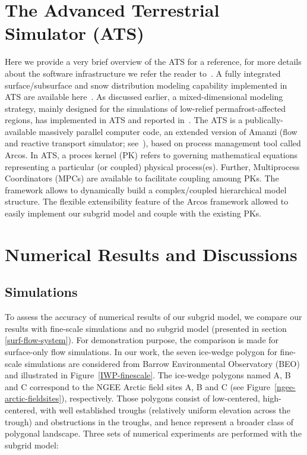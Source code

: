 \documentclass[review,11pt]{elsarticle}
\begin{document}
\section{The Advanced Terrestrial Simulator (ATS)}\label{ATS}
Here we provide a very brief overview of the ATS for a reference, for more details about the software infrastructure we refer the reader to~\cite{ecoon2016managing, ats-website}. A fully integrated surface/subsurface and snow distribution modeling capability implemented in ATS are available here~\cite{spainter2016integrated, atchley2015}. As discussed earlier, a mixed-dimensional modeling strategy, mainly designed for the simulations of low-relief permafrost-affected regions, has implemented in ATS and reported in~\cite{jan2017}. The ATS is a publically-available massively parallel computer code, an extended version of Amanzi (flow and reactive transport simulator; see~\cite{moulton2012high}), based on process management tool called Arcos. In ATS, a proces kernel (PK) refers to governing mathematical equations representing a particular (or coupled) physical process(es). Further, Multiprocess Coordinators (MPCs) are available to facilitate coupling amoung PKs. The framework allows to dynamically build a complex/coupled hierarchical model structure. The flexible extensibility feature of the Arcos framework allowed to easily implement our subgrid model and couple with the existing PKs.

\section{Numerical Results and Discussions}\label{numerical-tests}
\FloatBarrier
\subsection{Simulations}
To assess the accuracy of numerical results of our subgrid model, we compare our results with fine-scale simulations and no subgrid model (presented in section \ref{surf-flow-system}). For demonstration purpose, the comparison is made for surface-only flow simulations. In our work, the seven ice-wedge polygon for fine-scale simulations are considered from Barrow Environmental Observatory (BEO) and illustrated in Figure~\ref{IWP-finescale}. The ice-wedge polygons named A, B and C correspond to the NGEE Arctic field sites A, B and C (see Figure~\ref{ngee-arctic-fieldsites}), respectively. Those polygons consist of low-centered, high-centered, with well established troughs (relatively uniform elevation across the trough) and obstructions in the troughs, and hence represent a broader class of polygonal landscape. Three sets of numerical experiments are performed with the subgrid model:
\end{document}
